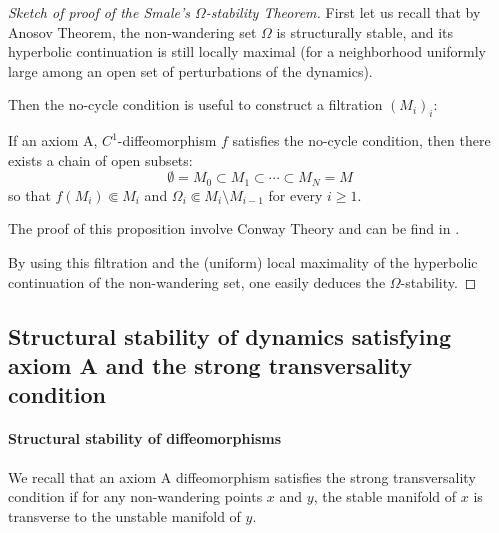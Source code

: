 \documentclass[11pt,openany,leqno]{article}
\begin{document}
\begin{proof}[Sketch of proof of the Smale's $\Omega$-stability Theorem]
First let us recall that by Anosov Theorem, the non-wandering set $\Omega$ is structurally stable, and its hyperbolic continuation is still locally maximal (for a neighborhood uniformly large among an open set of perturbations of the dynamics).

Then the no-cycle condition is useful to construct a filtration $(M_i)_i$:
\begin{prop}
If an axiom A, $C^1$-diffeomorphism $f$ satisfies the no-cycle condition, then there exists a chain of open subsets:
\[\emptyset = M_0 \subset M_1\subset \cdots \subset M_N=M\]
 so that 
  $f(M_i)\Subset M_i$ and $\Omega_i \Subset M_{i}\setminus M_{i-1}$ for every $i\ge 1$.
 \end{prop}
The proof of this proposition involve Conway Theory and can be find 
in \cite[Thm 2.3 p. 9]{shubstab78}.


By using this filtration and the (uniform) local maximality of the hyperbolic continuation of the non-wandering set, one easily deduces the $\Omega$-stability. 
%
%
\end{proof}




\subsection{Structural stability of dynamics satisfying axiom A and  the strong transversality condition}\label{hypimpliesstab2} 
\paragraph{Structural stability of diffeomorphisms}
We recall that an axiom A diffeomorphism satisfies the {strong transversality condition} if for any  non-wandering points $x$ and $y$, the stable manifold of $x$ is transverse to the unstable manifold of $y$.
\end{document}
